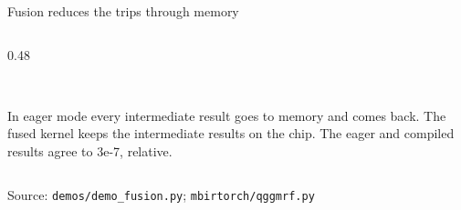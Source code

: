 \documentclass[aspectratio=169,10pt]{beamer}
\newcommand{\source}[1]{\par\vfill{\scriptsize\textcolor{inkGray}{Source: #1}\par}}
\newcommand{\figcaption}[1]{{\scriptsize\textcolor{inkGray}{#1}\par}}
\begin{document}
\begin{frame}{Fusion reduces the trips through memory}
\begin{columns}[T]
\begin{column}{0.48\textwidth}
\\[6pt]
      \figcaption{In eager mode every intermediate result goes to memory and
      comes back.  The fused kernel keeps the intermediate results on the
      chip.  The eager and compiled results agree to 3e-7, relative.}
    \end{column}
  \end{columns}
  \source{\texttt{demos/demo\_fusion.py}; \texttt{mbirtorch/qggmrf.py}}
\end{frame}
\end{document}
